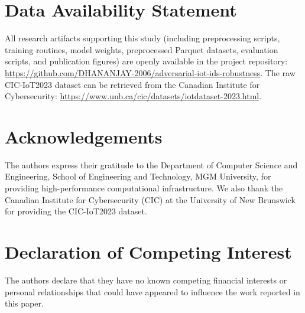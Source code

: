 \documentclass[final,5p,times,twocolumn]{elsarticle}
\begin{document}
\section*{Data Availability Statement}
All research artifacts supporting this study (including preprocessing scripts, training routines, model weights, preprocessed Parquet datasets, evaluation scripts, and publication figures) are openly available in the project repository: \url{https://github.com/DHANANJAY-2006/adversarial-iot-ids-robustness}. The raw CIC-IoT2023 dataset can be retrieved from the Canadian Institute for Cybersecurity: \url{https://www.unb.ca/cic/datasets/iotdataset-2023.html}.

\section*{Acknowledgements}
The authors express their gratitude to the Department of Computer Science and Engineering, School of Engineering and Technology, MGM University, for providing high-performance computational infrastructure. We also thank the Canadian Institute for Cybersecurity (CIC) at the University of New Brunswick for providing the CIC-IoT2023 dataset.

\section*{Declaration of Competing Interest}
The authors declare that they have no known competing financial interests or personal relationships that could have appeared to influence the work reported in this paper.


\end{document}
